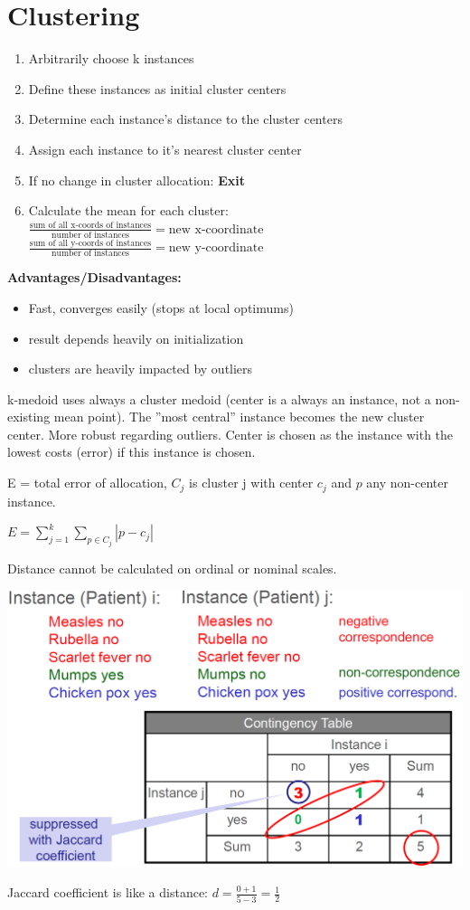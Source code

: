 \section{Clustering}

\begin{breakbox}

\begin{enumerate}
	\item Arbitrarily choose k instances
	\item Define these instances as initial cluster centers
	\item Determine each instance's distance to the cluster centers
	\item Assign each instance to it's nearest cluster center
	\item If no change in cluster allocation: \textbf{Exit}
	\item Calculate the mean for each cluster:
	$\frac{\text{sum of all x-coords of instances}}{\text{number of instances}} = \text{new x-coordinate}$
	$\frac{\text{sum of all y-coords of instances}}{\text{number of instances}} = \text{new y-coordinate}$
\end{enumerate}

\textbf{Advantages/Disadvantages:}
\begin{itemize}
	\item Fast, converges easily (stops at local optimums)
	\item result depends heavily on initialization
	\item clusters are heavily impacted by outliers
\end{itemize}

k-medoid uses always a cluster medoid (center is a always an instance, not a non-existing mean point). The ''most central'' instance becomes the new cluster center. More robust regarding outliers. Center is chosen as the instance with the lowest costs (error) if this instance is chosen.

E = total error of allocation, $C_j$ is cluster j with center $c_j$ and $p$ any non-center instance.
\begin{center}
	$E=\sum_{j=1}^{k} \sum_{p \in C_j}^{} |p-c_j|$
\end{center}

\end{breakbox}

\begin{breakbox}
Distance cannot be calculated on ordinal or nominal scales.

\begin{center}
	\includegraphics[width=.15\textwidth]{slides_images/clustering_binary_distance.png}
\end{center}

Jaccard coefficient is like a distance: $d=\frac{0+1}{5-3} = \frac{1}{2}$

\end{breakbox}



